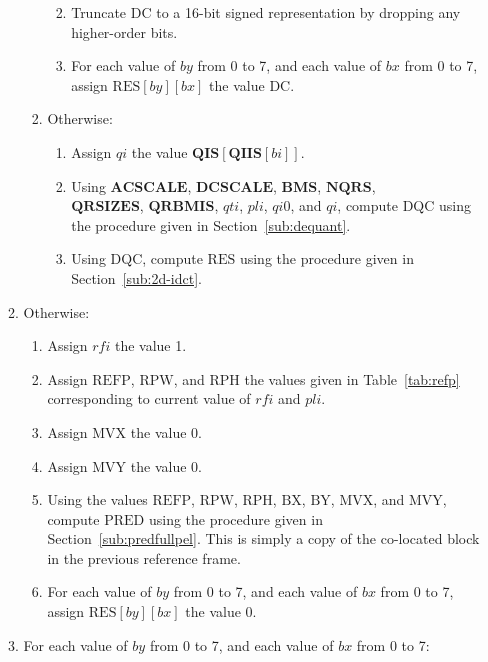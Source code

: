 \documentclass[9pt,letterpaper]{book}
\newcommand{\idx}[1]{{\ensuremath{\mathit{#1}}}}
\newcommand{\qti}{\idx{qti}}
\newcommand{\pli}{\idx{pli}}
\newcommand{\qi}{\idx{qi}}
\newcommand{\bi}{\idx{bi}}
\newcommand{\rfi}{\idx{rfi}}
\newcommand{\bitvar}[1]{\ensuremath{\mathbf{\bm{#1}}}}
\newcommand{\locvar}[1]{\ensuremath{\mathrm{#1}}}
\numberwithin{equation}{chapter}
\numberwithin{figure}{chapter}
\numberwithin{table}{chapter}
\begin{document}
\begin{enumerate}
\begin{enumerate}
\begin{enumerate}
\begin{enumerate}
\begin{equation*}
\end{equation*}
\item
Truncate \locvar{DC} to a 16-bit signed representation by dropping any
 higher-order bits.
\item
For each value of \locvar{\idx{by}} from 0 to 7, and each value of
 \locvar{\idx{bx}} from 0 to 7, assign
 $\locvar{RES}[\locvar{\idx{by}}][\locvar{\idx{bx}}]$ the value \locvar{DC}.
\end{enumerate}
\item
Otherwise:
\begin{enumerate}
\item
Assign \locvar{\qi} the value $\bitvar{QIS}[\bitvar{QIIS}[\locvar{\bi}]]$.
\item
Using \bitvar{ACSCALE}, \bitvar{DCSCALE}, \bitvar{BMS}, \bitvar{NQRS}, \\
 \bitvar{QRSIZES}, \bitvar{QRBMIS}, \locvar{\qti}, \locvar{\pli},
 \locvar{\idx{qi0}}, and \locvar{\qi}, compute \locvar{DQC} using the procedure
 given in Section~\ref{sub:dequant}.
\item
Using \locvar{DQC}, compute \locvar{RES} using the procedure given in
 Section~\ref{sub:2d-idct}.
\end{enumerate}
\end{enumerate}
\item
Otherwise:
\begin{enumerate}
\item
Assign \locvar{\rfi} the value 1.
\item
Assign \locvar{REFP}, \locvar{RPW}, and \locvar{RPH} the values given in
 Table~\ref{tab:refp} corresponding to current value of \locvar{\rfi} and
 \locvar{\pli}.
\item
Assign \locvar{MVX} the value 0.
\item
Assign \locvar{MVY} the value 0.
\item
Using the values \locvar{REFP}, \locvar{RPW}, \locvar{RPH}, \locvar{BX},
 \locvar{BY}, \locvar{MVX}, and \locvar{MVY}, compute \locvar{PRED} using the
 procedure given in Section~\ref{sub:predfullpel}.
This is simply a copy of the co-located block in the previous reference frame.
\item
For each value of \locvar{\idx{by}} from 0 to 7, and each value of
 \locvar{\idx{bx}} from 0 to 7, assign
 $\locvar{RES}[\locvar{\idx{by}}][\locvar{\idx{bx}}]$ the value 0.
\end{enumerate}
\item
For each value of \locvar{\idx{by}} from 0 to 7, and each value of
 \locvar{\idx{bx}} from 0 to 7:

\end{enumerate}
\end{enumerate}
\end{document}
